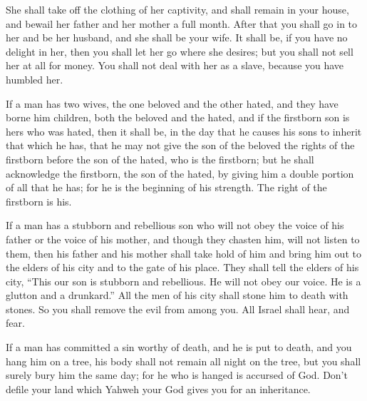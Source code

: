 {She shall take off the clothing of her captivity, and shall remain in your house, and bewail her father and her mother a full month. After that you shall go in to her and be her husband, and she shall be your wife.
It shall be, if you have no delight in her, then you shall let her go where she desires; but you shall not sell her at all for money. You shall not deal with her as a slave, because you have humbled her.
\par }{\PP {}If a man has two wives, the one beloved and the other hated, and they have borne him children, both the beloved and the hated, and if the firstborn son is hers who was hated,
then it shall be, in the day that he causes his sons to inherit that which he has, that he may not give the son of the beloved the rights of the firstborn before the son of the hated, who is the firstborn;
but he shall acknowledge the firstborn, the son of the hated, by giving him a double portion of all that he has; for he is the beginning of his strength. The right of the firstborn is his.
\par }{\PP {}If a man has a stubborn and rebellious son who will not obey the voice of his father or the voice of his mother, and though they chasten him, will not listen to them,
then his father and his mother shall take hold of him and bring him out to the elders of his city and to the gate of his place.
They shall tell the elders of his city, “This our son is stubborn and rebellious. He will not obey our voice. He is a glutton and a drunkard.”
All the men of his city shall stone him to death with stones. So you shall remove the evil from among you. All Israel shall hear, and fear.
\par }{\PP {}If a man has committed a sin worthy of death, and he is put to death, and you hang him on a tree,
his body shall not remain all night on the tree, but you shall surely bury him the same day; for he who is hanged is accursed of God. Don’t defile your land which Yahweh your God gives you for an inheritance.

}
